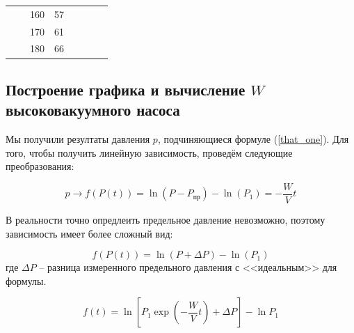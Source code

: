 \documentclass{article}
\newcommand{\x}{\text}
\begin{document}
\begin{table}[h!]
\begin{tabular}{llllllll}
                                            &                                     & \multicolumn{1}{|l|}{160}       & \multicolumn{1}{|l|}{57 }       &                          &                           &                          &                           \\\cline{3-4}
                                            &                                     & \multicolumn{1}{|l|}{170}       & \multicolumn{1}{|l|}{61 }       &                          &                           &                          &                           \\\cline{3-4}
                                            &                                     & \multicolumn{1}{|l|}{180}       & \multicolumn{1}{|l|}{66 }       &                          &                           &                          &                           \\\cline{3-4}
    \end{tabular}
\end{table}


\subsection*{Построение графика и вычисление $W$ высоковакуумного насоса}

Мы получили резултаты давления $p$, подчиняющиеся формуле (\ref{that_one}). Для того, чтобы получить линейную зависимость, проведём следующие преобразования:

$$p \longrightarrow f(P(t)) = \ln(P-P_{\x{пр}}) - \ln(P_1) = -\frac{W}{V}t$$

В реальности точно опредлеить предельное давление невозможно, поэтому зависимость имеет более сложный вид:

$$ f(P(t)) = \ln(P+\Delta P) - \ln(P_1)$$
где $\Delta P$ -- разница измеренного предельного давления с <<идеальным>> для формулы.

\begin{equation}\label{f}
    f(t) = \ln\left[ P_1 \exp\left(-\frac{W}{V} t\right) + \Delta P \right] - \ln P_1
\end{equation}

\end{document}
